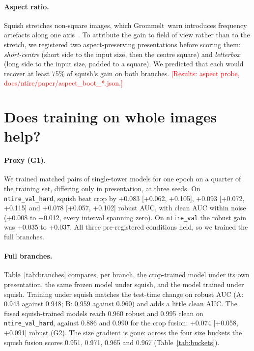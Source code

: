 \documentclass[10pt,twocolumn,letterpaper]{article}
\newcommand{\pending}[1]{\textcolor{red}{[#1]}}
\begin{document}
\paragraph{Aspect ratio.} Squish stretches non-square images, which
Grommelt~\etal warn introduces frequency artefacts along one
axis~\cite{grommelt2024fakeorjpeg}. To attribute the gain to field of view
rather than to the stretch, we registered two aspect-preserving presentations
before scoring them: \emph{short-centre} (short side to the input size, then
the centre square) and \emph{letterbox} (long side to the input size, padded
to a square). We predicted that each would recover at least 75\% of squish's
gain on both branches. \pending{Results: aspect probe, docs/ntire/paper/aspect\_boot\_*.json.}

\section{Does training on whole images help?}
\label{sec:training}

\paragraph{Proxy (G1).} We trained matched pairs of single-tower models for
one epoch on a quarter of the training set, differing only in presentation,
at three seeds. On \texttt{ntire\_val\_hard}, squish beat crop by +0.083
[+0.062, +0.105], +0.093 [+0.072, +0.115] and +0.078 [+0.057, +0.102] robust
AUC, with clean AUC within noise (+0.008 to +0.012, every interval spanning
zero). On \texttt{ntire\_val} the robust gain was +0.035 to +0.037. All three
pre-registered conditions held, so we trained the full branches.

\paragraph{Full branches.} Table~\ref{tab:branches} compares, per branch, the
crop-trained model under its own presentation, the same frozen model under
squish, and the model trained under squish. Training under squish matches the
test-time change on robust AUC (A: 0.943 against 0.948; B: 0.959 against
0.960) and adds a little clean AUC. The fused squish-trained models reach
0.960 robust and 0.995 clean on \texttt{ntire\_val\_hard}, against 0.886 and
0.990 for the crop fusion: +0.074 [+0.058, +0.091] robust (G2). The size
gradient is gone: across the four size buckets the squish fusion scores 0.951,
0.971, 0.965 and 0.967 (Table~\ref{tab:buckets}).
\end{document}
